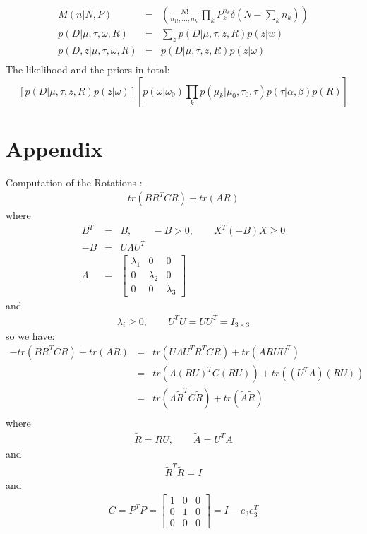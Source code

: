 \documentclass[11pt]{article}
\begin{document}
\begin{eqnarray*}
M(n|N,P) &=& (\frac{{N!}}{n_{1!},...,n_{k!}}\prod_kP_k^{n_k}\delta(N-\sum_kn_k)) \\
p(D|\mu,\tau,\omega,R) &=& \sum_zp(D|\mu,\tau,z,R)p(z|w)\\
p(D,z|\mu,\tau,\omega,R) &=& p(D|\mu,\tau,z,R)p(z|\omega)\\
\end{eqnarray*}
The likelihood and the priors in total:
\begin{equation*}
\left[p(D|\mu,\tau,z,R)p(z|\omega)\right]\left[p(\omega|\omega_0)\prod_kp(\mu_k|\mu_0,\tau_0,\tau)p(\tau|\alpha,\beta)p(R)\right]
\end{equation*}

\section{Appendix}
Computation of the Rotations :
\begin{eqnarray*}
tr(BR^TCR)+tr(AR)
\end{eqnarray*}
where
\begin{eqnarray*}
B^T &=& B, \qquad -B>0, \qquad X^T(-B)X\geq0 \\
-B &=& U\Lambda U^T \\
\Lambda &=& \begin{bmatrix}\lambda_1 & 0 &0 \\0 & \lambda_2 &0 \\ 0 &0 & \lambda_3\end{bmatrix}
\end{eqnarray*}
and
\begin{eqnarray*}
 \lambda_i\geq0, \qquad U^TU=UU^T=I_{3\times3} 
\end{eqnarray*}
so we have:
\begin{eqnarray*}
-tr(BR^TCR)+tr(AR)&=&tr(U\Lambda U^TR^TCR)+tr(ARUU^T) \\
&=&tr(\Lambda (RU)^TC(RU))+tr((U^TA)(RU)) \\
&=&tr(\Lambda \tilde{R}^TC\tilde{R})+tr(\tilde{A}\tilde{R}) \\
\end{eqnarray*}
where
\begin{eqnarray*}
\tilde{R}=RU, \qquad \tilde{A}=U^TA 
\end{eqnarray*}
and  
\begin{eqnarray*}
\tilde{R}^T\tilde{R}=I 
\end{eqnarray*}
and 
\begin{eqnarray*}
C=P^TP=\begin{bmatrix}1 & 0 &0 \\ 0 & 1 & 0 \\ 0&0&0 \end{bmatrix}=I-e_3e_3^T 
\end{eqnarray*}
\end{document}

